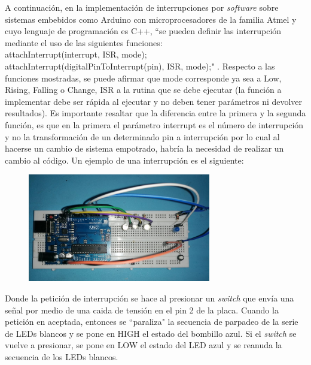 \documentclass[11pt,letterpaper]{article}
\begin{document}
\newline
\newline
A continuación, en la implementación de interrupciones por \textit{software} sobre sistemas embebidos como Arduino con microprocesadores de la familia Atmel y cuyo lenguaje de programación es C++, ``se pueden definir las interrupción mediante el uso de las siguientes funciones: 
\\attachInterrupt(interrupt, ISR, mode); \\attachInterrupt(digitalPinToInterrupt(pin), ISR, mode);" \cite{c5}.
\newline
Respecto a las funciones mostradas, se puede afirmar que mode corresponde ya sea a Low, Rising, Falling o Change, ISR a la rutina que se debe ejecutar (la función a implementar debe ser rápida al ejecutar y no deben tener parámetros ni devolver resultados). Es importante resaltar que la diferencia entre la primera y la segunda función, es que en la primera el parámetro interrupt es el número de interrupción y no la transformación de un determinado pin a interrupción por lo cual al hacerse un cambio de sistema empotrado, habría la necesidad de realizar un cambio al código.
\newline
\newline
Un ejemplo de una interrupción es el siguiente:
\begin{figure}[h]
\centering
\includegraphics[width=8cm]{./imagenes/Ejemplo_01.jpeg}
\end{figure}
\newline
Donde la petición de interrupción se hace al presionar un \textit{switch} que envía una señal por medio de una caida de tensión en el pin 2 de la placa. Cuando la petición en aceptada, entonces se ``paraliza" la secuencia de parpadeo de la serie de LEDs blancos y se pone en HIGH el estado del bombillo azul. Si el \textit{switch} se vuelve a presionar, se pone en LOW el estado del LED azul y se reanuda la secuencia de los LEDs blancos.

\end{document}
